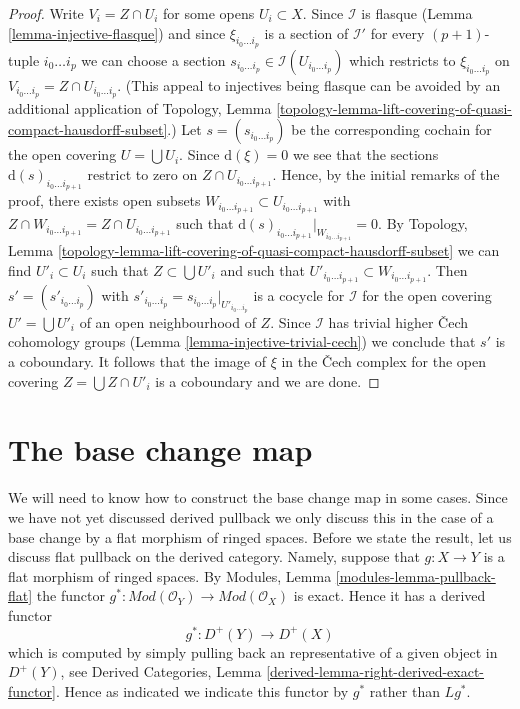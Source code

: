 \begin{proof}
\medskip\noindent
Write $V_i = Z \cap U_i$ for some opens $U_i \subset X$.
Since $\mathcal{I}$ is flasque (Lemma \ref{lemma-injective-flasque})
and since $\xi_{i_0 \ldots i_p}$ is a section of $\mathcal{I}'$
for every $(p + 1)$-tuple $i_0 \ldots i_p$ we can choose
a section $s_{i_0 \ldots i_p} \in \mathcal{I}(U_{i_0 \ldots i_p})$
which restricts to $\xi_{i_0 \ldots i_p}$ on
$V_{i_0 \ldots i_p} = Z \cap U_{i_0 \ldots i_p}$.
(This appeal to injectives being flasque can be avoided by an
additional application of
Topology, Lemma
\ref{topology-lemma-lift-covering-of-quasi-compact-hausdorff-subset}.)
Let $s = (s_{i_0 \ldots i_p})$ be the corresponding cochain
for the open covering $U = \bigcup U_i$.
Since $\text{d}(\xi) = 0$ we see that the sections
$\text{d}(s)_{i_0 \ldots i_{p + 1}}$ restrict to zero
on $Z \cap U_{i_0 \ldots i_{p + 1}}$. Hence, by the initial
remarks of the proof, there exists open subsets
$W_{i_0 \ldots i_{p + 1}} \subset U_{i_0 \ldots i_{p + 1}}$
with $Z \cap W_{i_0 \ldots i_{p + 1}} = Z \cap U_{i_0 \ldots i_{p + 1}}$
such that $\text{d}(s)_{i_0 \ldots i_{p + 1}}|_{W_{i_0 \ldots i_{p + 1}}} = 0$.
By Topology, Lemma
\ref{topology-lemma-lift-covering-of-quasi-compact-hausdorff-subset}
we can find $U'_i \subset U_i$ such that $Z \subset \bigcup U'_i$
and such that $U'_{i_0 \ldots i_{p + 1}} \subset W_{i_0 \ldots i_{p + 1}}$.
Then $s' = (s'_{i_0 \ldots i_p})$ with
$s'_{i_0 \ldots i_p} = s_{i_0 \ldots i_p}|_{U'_{i_0 \ldots i_p}}$
is a cocycle for $\mathcal{I}$ for the open covering
$U' = \bigcup U'_i$ of an open neighbourhood of $Z$.
Since $\mathcal{I}$ has trivial higher {\v C}ech cohomology groups
(Lemma \ref{lemma-injective-trivial-cech})
we conclude that $s'$ is a coboundary. It follows that the image of
$\xi$ in the {\v C}ech complex for the open covering
$Z = \bigcup Z \cap U'_i$ is a coboundary and we are done.
\end{proof}






\section{The base change map}
\label{section-base-change-map}

\noindent
We will need to know how to construct the base change map in some cases.
Since we have not yet discussed derived pullback we only discuss
this in the case of a base change by a flat morphism of ringed spaces.
Before we state the result, let us discuss flat pullback on the derived
category. Namely, suppose that $g : X \to Y$ is a flat morphism of
ringed spaces. By Modules, Lemma \ref{modules-lemma-pullback-flat}
the functor $g^* : \textit{Mod}(\mathcal{O}_Y) \to
\textit{Mod}(\mathcal{O}_X)$ is exact. Hence it has a derived functor
$$
g^* : D^{+}(Y) \to D^{+}(X)
$$
which is computed by simply pulling back an representative of a given
object in $D^{+}(Y)$, see
Derived Categories, Lemma \ref{derived-lemma-right-derived-exact-functor}.
Hence as indicated we indicate this functor by $g^*$ rather than
$Lg^*$.

